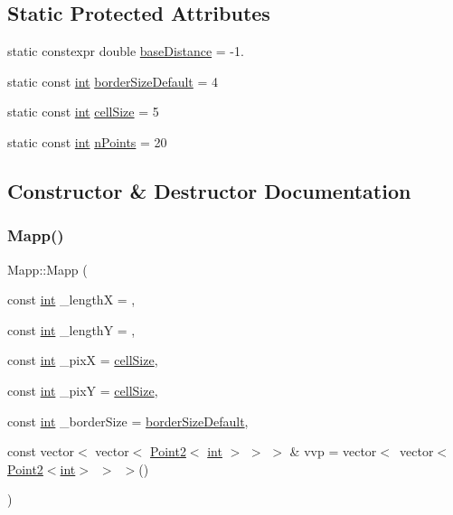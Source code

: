 \subsection*{Static Protected Attributes}
\begin{DoxyCompactItemize}
\item 
static constexpr double \mbox{\hyperlink{class_mapp_ae6b2f015604d9f3e34c7702aea081e08}{base\+Distance}} = -\/1.
\item 
static const \mbox{\hyperlink{draw_8hh_aa620a13339ac3a1177c86edc549fda9b}{int}} \mbox{\hyperlink{class_mapp_aef8bde83114714a4ce4ad9d13766e761}{border\+Size\+Default}} = 4
\item 
static const \mbox{\hyperlink{draw_8hh_aa620a13339ac3a1177c86edc549fda9b}{int}} \mbox{\hyperlink{class_mapp_a8216044ff8e95ba054985e26ae1c75f8}{cell\+Size}} = 5
\item 
static const \mbox{\hyperlink{draw_8hh_aa620a13339ac3a1177c86edc549fda9b}{int}} \mbox{\hyperlink{class_mapp_addd9fcc5e7db2c40038ab32ecf29171c}{n\+Points}} = 20
\end{DoxyCompactItemize}


\subsection{Constructor \& Destructor Documentation}
\mbox{\label{class_mapp_a748ffcb20519591210f19458c90f482a}} 
\subsubsection{\texorpdfstring{Mapp()}{Mapp()}}
{\footnotesize\ttfamily Mapp\+::\+Mapp (\begin{DoxyParamCaption}\item[{const \mbox{\hyperlink{draw_8hh_aa620a13339ac3a1177c86edc549fda9b}{int}}}]{\+\_\+lengthX = {},  }\item[{const \mbox{\hyperlink{draw_8hh_aa620a13339ac3a1177c86edc549fda9b}{int}}}]{\+\_\+lengthY = {},  }\item[{const \mbox{\hyperlink{draw_8hh_aa620a13339ac3a1177c86edc549fda9b}{int}}}]{\+\_\+pixX = {\ttfamily \mbox{\hyperlink{class_mapp_a8216044ff8e95ba054985e26ae1c75f8}{cell\+Size}}},  }\item[{const \mbox{\hyperlink{draw_8hh_aa620a13339ac3a1177c86edc549fda9b}{int}}}]{\+\_\+pixY = {\ttfamily \mbox{\hyperlink{class_mapp_a8216044ff8e95ba054985e26ae1c75f8}{cell\+Size}}},  }\item[{const \mbox{\hyperlink{draw_8hh_aa620a13339ac3a1177c86edc549fda9b}{int}}}]{\+\_\+border\+Size = {\ttfamily \mbox{\hyperlink{class_mapp_aef8bde83114714a4ce4ad9d13766e761}{border\+Size\+Default}}},  }\item[{const vector$<$ vector$<$ \mbox{\hyperlink{class_point2}{Point2}}$<$ \mbox{\hyperlink{draw_8hh_aa620a13339ac3a1177c86edc549fda9b}{int}} $>$ $>$ $>$ \&}]{vvp = {\ttfamily vector$<$~vector$<$\mbox{\hyperlink{class_point2}{Point2}}$<$\mbox{\hyperlink{draw_8hh_aa620a13339ac3a1177c86edc549fda9b}{int}}$>$~$>$~$>$()} }\end{DoxyParamCaption})}



